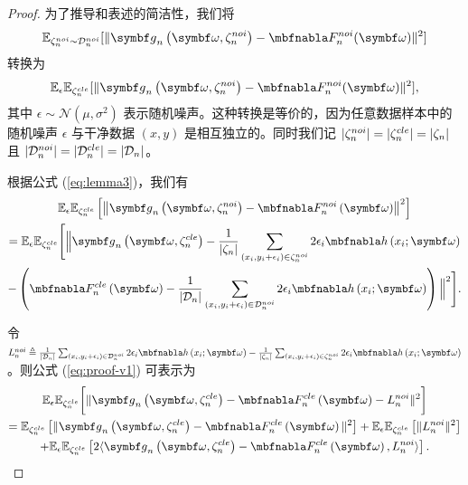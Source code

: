 \begin{proof}
为了推导和表述的简洁性，我们将
$$
\mathbb{E}_{\zetanoi_n\sim \Dnoi_n}[\Vert \gb_n\left(\omegab,\zetanoi_n\right) - \nabla \fnoi_n(\omegab) \Vert^2 ]
$$
转换为
$$
\mathbb{E}_\epsilon\mathbb{E}_{\zetacle_n}[\Vert \gb_n\left(\omegab,\zetanoi_n\right) - \nabla \fnoi_n(\omegab) \Vert^2 ],
$$
其中 $\epsilon\sim \mathcal{N}(\mu, \sigma^2)$ 表示随机噪声。这种转换是等价的，因为任意数据样本中的随机噪声 $\epsilon$ 与干净数据 $(x,y)$ 是相互独立的。同时我们记 $|\zeta^{noi}_n|=|\zeta^{cle}_n|=|\zeta_n|$ 且 $|\mathcal{D}^{noi}_n|=|\mathcal{D}^{cle}_n|=|\mathcal{D}_n|$。

根据公式 (\ref{eq:lemma3})，我们有
\begin{multline}\label{eq:proof-v1}
\mathbb{E}_\epsilon\mathbb{E}_{\zetacle_n}\left[\left\Vert \gb_n\left(\omegab,\zetanoi_n\right) - \nabla \fnoi_n\left(\omegab\right) \right\Vert^2 \right]
\\=\mathbb{E}_\epsilon\mathbb{E}_{\zetacle_n}\Biggl[\Big\Vert \gb_n\left(\omegab,\zetacle_n\right) -\frac{1}{|\zeta_n|}\sum_{\left(x_i,y_i+\epsilon_i\right)\in \zetanoi_n}2\epsilon_i\nabla h\left(x_i;\omegab\right)
\\ -\left(\nabla \fcle_n\left(\omegab\right)-\frac{1}{|\D_n|}\sum_{\left(x_i,y_i+\epsilon_i\right)\in \Dnoi_n}2\epsilon_i\nabla h\left(x_i;\omegab\right)\right)\Big\Vert^2\Biggl].
\end{multline}

令 $L_n^{noi}\triangleq\frac{1}{|\D_n|}\sum_{\left(x_i,y_i+\epsilon_i\right)\in \Dnoi_n}2\epsilon_i\nabla h\left(x_i;\omegab\right) 
-\frac{1}{|\zeta_n|}\sum_{\left(x_i,y_i+\epsilon_i\right)\in \zetanoi_n}2\epsilon_i\nabla h\left(x_i;\omegab\right)$。则公式 (\ref{eq:proof-v1}) 可表示为
\begin{multline}\label{eq:proof-v2}
    \mathbb{E}_\epsilon\mathbb{E}_{\zetacle_n}\biggl[\Vert \gb_n\left(\omegab,\zetacle_n\right)-\nabla \fcle_n\left(\omegab\right)-L_n^{noi}\Vert^2\biggl]\\=\mathbb{E}_{\zetacle_n}\left[\Vert\gb_n\left(\omegab,\zetacle_n\right)-\nabla \fcle_n\left(\omegab\right)\Vert^2\right]
    +\mathbb{E}_\epsilon\mathbb{E}_{\zetacle_n}\left[\Vert L_n^{noi}\Vert^2\right] \\
    +\mathbb{E}_\epsilon\mathbb{E}_{\zetacle_n}\left[2\langle\gb_n\left(\omegab,\zetacle_n\right)-\nabla \fcle_n\left(\omegab\right),L_n^{noi}\rangle\right].
\end{multline}


\end{proof}
